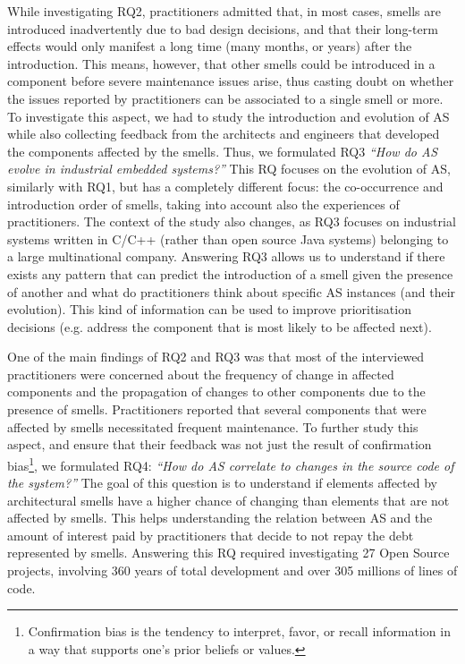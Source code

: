 While investigating RQ2, practitioners admitted that, in most cases, 
smells are introduced inadvertently due to bad design decisions, and that their long-term effects would only manifest a long time (many months, or years) after the introduction.
This means, however, that other smells could be introduced in a component before severe maintenance issues arise, thus casting doubt on whether the issues reported by practitioners can be associated to a single smell or more.
To investigate this aspect, we had to study the introduction and evolution of AS while also collecting feedback from the architects and engineers that developed the components affected by the smells.
Thus, we formulated RQ3 \textit{``How do AS evolve in industrial embedded systems?''}
This RQ focuses on the evolution of AS, similarly with RQ1, but has a completely different focus: the co-occurrence and introduction order of smells, taking into account also the experiences of practitioners.
The context of the study also changes, as RQ3 focuses on industrial systems written in C/C++ (rather than open source Java systems) belonging to a large multinational company.
Answering RQ3 allows us to understand if there exists any pattern that can predict the introduction of a smell given the presence of another and what do practitioners think about specific AS instances (and their evolution).
This kind of information can be used to improve prioritisation decisions (e.g. address the component that is most likely to be affected next).

One of the main findings of RQ2 and RQ3 was that most of the interviewed practitioners were concerned about the frequency of change in affected components and the propagation of changes to other components due to the presence of smells. 
Practitioners reported that several components that were affected by smells necessitated frequent maintenance.
To further study this aspect, and ensure that their feedback was not just the result of confirmation bias\footnote{Confirmation bias is the tendency to interpret, favor, or recall information in a way that supports one's prior beliefs or values.}, we formulated RQ4: \textit{``How do AS correlate to changes in the source code of the system?''}
The goal of this question is to understand if elements affected by architectural smells have a higher chance of changing than elements that are not affected by smells.
This helps understanding the relation between AS and the amount of interest paid by practitioners that decide to not repay the debt represented by smells.
Answering this RQ required investigating 27 Open Source projects, involving 360 years of total development and over 305 millions of lines of code.

